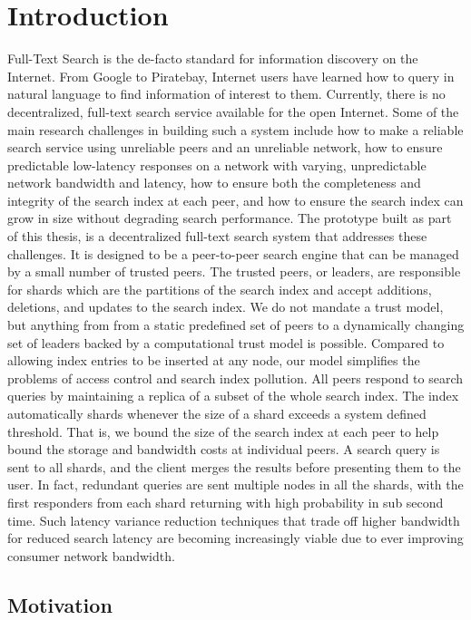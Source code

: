 \documentclass[a4paper,11pt]{kth-mag}
\begin{document}
\chapter{Introduction}
\label{chap:introduction}
Full-Text Search is the de-facto standard for information discovery on the Internet. From Google to Piratebay, Internet users have learned how to query in natural language to find information of interest to them. Currently, there is no decentralized, full-text search service available for the open Internet. Some of the main research challenges in building such a system include how to make a reliable search service using unreliable peers and an unreliable network, how to ensure predictable low-latency responses on a network with varying, unpredictable network bandwidth and latency, how to ensure both the completeness and integrity of the search index at each peer, and how to ensure the search index can grow in size without degrading search performance. The prototype built as part of this thesis, is a decentralized full-text search system that addresses these challenges. It is designed to be a peer-to-peer search engine that can be managed by a small number of trusted peers. The trusted peers, or leaders, are responsible for shards which are the partitions of the search index and accept additions, deletions, and updates to the search index. We do not mandate a trust model, but anything from from a static predefined set of peers to a dynamically changing set of leaders backed by a computational trust model is possible. Compared to allowing index entries to be inserted at any node, our model simplifies the problems of access control and search index pollution. All peers respond to search queries by maintaining a replica of a subset of the whole search index. The index automatically shards whenever the size of a shard exceeds a system defined threshold. That is, we bound the size of the search index at each peer to help bound the storage and bandwidth costs at individual peers. A search query is sent to all shards, and the client merges the results before presenting them to the user. In fact, redundant queries are sent multiple nodes in all the shards, with the first responders from each shard returning with high probability in sub second time. Such latency variance reduction techniques that trade off higher bandwidth for reduced search latency are becoming increasingly viable due to ever improving consumer network bandwidth.


\section{Motivation}
\label{sec:motivation}
\end{document}
